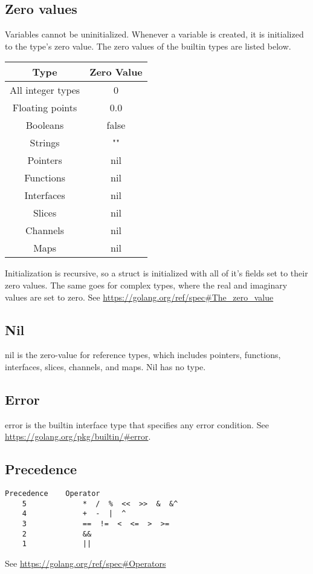 \documentclass{article}
\begin{document}
	\subsection{Zero values}
		Variables cannot be uninitialized. Whenever a variable is created, it is initialized to the type's zero value. The zero values of the builtin types are listed below. 
		\begin{center}
			\begin{tabular}{ | c | c | }
			\hline
 			Type & Zero Value  \\ 
			\hline
 			All integer types & 0  \\  
 			Floating points & 0.0   \\
			Booleans & false \\
			Strings & "" \\
			Pointers & nil \\
			Functions & nil \\
			Interfaces & nil \\
			Slices & nil \\
			Channels & nil \\
			Maps & nil \\
			\hline
			\end{tabular}
		\end{center}
		Initialization is recursive, so a struct is initialized with all of it's fields set to their zero values. The same goes for complex types, where the real and imaginary values are set to zero.
		See \url{https://golang.org/ref/spec#The_zero_value}	
		
	\subsection{Nil}
	\colorbox{code}{nil} is the zero-value for reference types, which includes pointers, functions, interfaces, slices, channels, and maps. Nil has no type. 
		
	\subsection{Error}
	\colorbox{code}{error} is the builtin interface type that specifies any error condition. See \url{https://golang.org/pkg/builtin/#error}.
		
	\subsection{Precedence}
	\begin{verbatim}
Precedence    Operator
    5             *  /  %  <<  >>  &  &^
    4             +  -  |  ^
    3             ==  !=  <  <=  >  >=
    2             &&
    1             ||
	\end{verbatim}
	See \url{https://golang.org/ref/spec#Operators}
\end{document}
